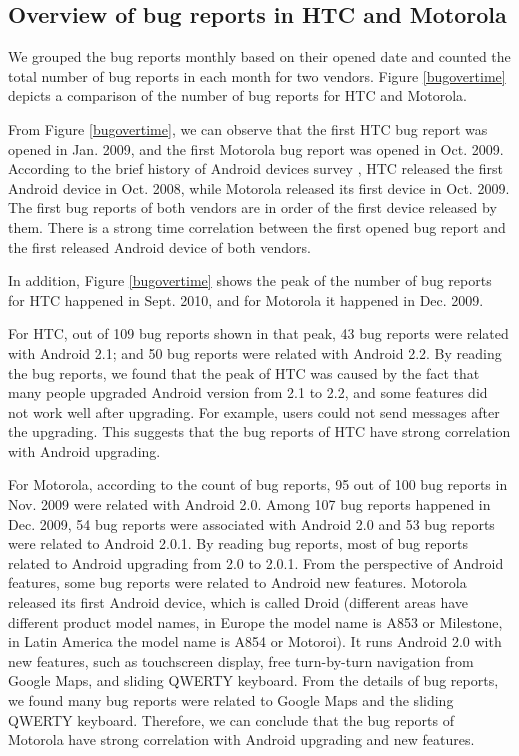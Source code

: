 \documentclass[10pt, conference, compsocconf]{IEEEtran}
\begin{document}
\subsection{Overview of bug reports in HTC and Motorola}

We grouped the bug reports monthly based on their opened date and counted the total number of bug reports in each month for two vendors. Figure \ref{bugovertime} depicts a comparison of the number of bug reports for HTC and Motorola.

From Figure \ref{bugovertime}, we can observe that the first HTC bug report was opened in Jan. 2009, and the first Motorola bug report was opened in Oct. 2009. According to the brief history of Android devices survey \cite{historyofandroid}, HTC released the first Android device in Oct. 2008, while Motorola released its first device in Oct. 2009. The first bug reports of both vendors are in order of the first device released by them. There is a strong time correlation between the first opened bug report and the first released Android device of both vendors.

In addition, Figure \ref{bugovertime} shows the peak of the number of bug reports for HTC happened in Sept. 2010, and for Motorola it happened in Dec. 2009. 

For HTC, out of 109 bug reports shown in that peak, 43 bug reports were related with Android 2.1; and 50 bug reports were related with Android 2.2. By reading the bug reports, we found that the peak of HTC was caused by the fact that many people upgraded Android version from 2.1 to 2.2, and some features did not work well after upgrading. For example, users could not send messages after the upgrading. This suggests that the bug reports of HTC have strong correlation with Android upgrading. 

For Motorola, according to the count of bug reports, 95 out of 100 bug reports in Nov. 2009 were related with Android 2.0. Among 107 bug reports happened in Dec. 2009, 54 bug reports were associated with Android 2.0 and 53 bug reports were related to Android 2.0.1. By reading bug reports, most of bug reports related to Android upgrading from 2.0 to 2.0.1. From the perspective of Android features, some bug reports were related to Android new features. Motorola released its first Android device, which is called Droid (different areas have different product model names, in Europe the model name is A853 or Milestone, in Latin America the model name is A854 or Motoroi). It runs Android 2.0 with new features, such as touchscreen display, free turn-by-turn navigation from Google Maps, and sliding QWERTY keyboard. From the details of bug reports, we found many bug reports were related to Google Maps and the sliding QWERTY keyboard. Therefore, we can conclude that the bug reports of Motorola have strong correlation with Android upgrading and new features.
\end{document}

